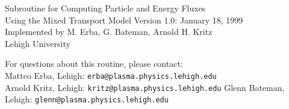 %

\headheight 0pt \headsep 0pt  \topmargin 0pt  \oddsidemargin 0pt
\textheight 9.0in \textwidth 6.5in


\begin{center}
{\LARGE Subroutine for Computing Particle and Energy Fluxes\\ \vskip8pt
Using the Mixed Transport Model}\vskip1.0cm
Version 1.0: January 18, 1999 \\ 
Implemented by M. Erba, G. Bateman, Arnold H. Kritz\\
 Lehigh University
\end{center}
For questions about this routine, please contact: \\
Matteo Erba, Lehigh:  {\tt erba@plasma.physics.lehigh.edu}\\
Arnold Kritz, Lehigh: {\tt kritz@plasma.physics.lehigh.edu}
Glenn Bateman, Lehigh: {\tt glenn@plasma.physics.lehigh.edu}


